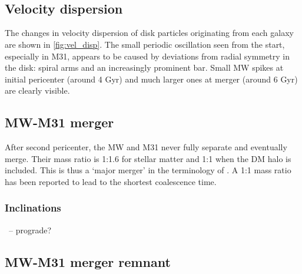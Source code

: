 \documentclass[twocolumn]{aastex63}
\newcommand{\todo}{\color{red}{TODO}\color{black}\hspace{2mm}}
\begin{document}
\todo{identify, trace history, trace fate}\ 

\todo{Jacobi radius}\ 

\subsection{Velocity dispersion}

The changes in velocity dispersion of disk particles originating from each galaxy are shown in \ref{fig:vel_disp}. The small periodic oscillation seen from the start, especially in M31, appears to be caused by deviations from radial symmetry in the disk: spiral arms and an increasingly prominent bar. Small MW spikes at initial pericenter (around 4 Gyr) and much larger ones at merger (around 6 Gyr) are clearly visible.

\begin{figure*}[htb!]
	\caption{Velocity dispersion of disk particles from each galaxy over time.
	\label{fig:vel_disp}}
\end{figure*}

\subsection{MW-M31 merger}

After second pericenter, the MW and M31 never fully separate and eventually merge. Their mass ratio is 1:1.6 for stellar matter and 1:1 when the DM halo is included. This is thus a `major merger' in the terminology of \todo{ref?}. A 1:1 mass ratio has been reported \citep{boylan-kolchin_dynamical_2008, ji_lifetime_2014} to lead to the shortest coalescence time.

\subsubsection{Inclinations}

\todo{Relative rotation axes of disks}\ -- prograde?

\todo{expanded 3D trajectories}

\todo{changes in velocity dispersion}

\todo{changes in mass profile}


\subsection{MW-M31 merger remnant}

\todo{shape - how to get principal axes? boxiness?}
\end{document}
